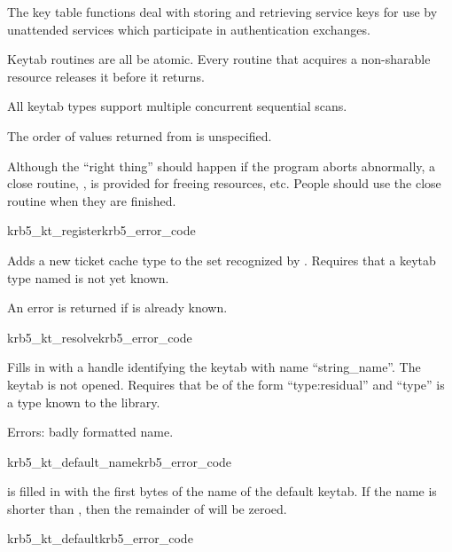 The key table functions deal with storing and retrieving service keys
for use by unattended services which participate in authentication exchanges.

Keytab routines are all be atomic.  Every routine that acquires
a non-sharable resource releases it before it returns. 

All keytab types support multiple concurrent sequential scans.

The order of values returned from  is
unspecified.

Although the ``right thing'' should happen if the program aborts
abnormally, a close routine, ,  is provided
for freeing resources, etc.  People should use the close routine when
they are finished.

\begin{funcdecl}{krb5_kt_register}{krb5_error_code}{\funcin}
\end{funcdecl}


Adds a new ticket cache type to the set recognized by
.
Requires that a keytab type named  is not
yet known.

An error is returned if  is already known.

\begin{funcdecl}{krb5_kt_resolve}{krb5_error_code}{\funcin}
\funcout
{}
\end{funcdecl}

Fills in  with a handle identifying the keytab with name
``string_name''.  The keytab is not opened.
Requires that  be of the form ``type:residual'' and
``type'' is a type known to the library.

Errors: badly formatted name.
		
\begin{funcdecl}{krb5_kt_default_name}{krb5_error_code}{\funcin}
\end{funcdecl}

 is filled in with the first  bytes of
the name of the default keytab.
If the name is shorter than , then the remainder of
 will be zeroed.


\begin{funcdecl}{krb5_kt_default}{krb5_error_code}{\funcin}
\end{funcdecl}

